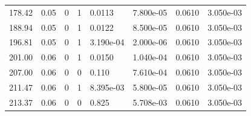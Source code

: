 \documentclass[preview]{standalone}
\begin{document}
{{\begin{tabular}{L{1.2cm}C{1.2cm} C{0.3cm}C{0.5cm} C{1.4cm}C{1.4cm} C{1.4cm}C{1.4cm}}
  178.42  &  0.05  & 0     &  1 &  0.0113  & 7.800e-05  & 0.0610 &  3.050e-03   \\ 
  188.94  &  0.05  & 0     &  1 &  0.0122  & 8.500e-05  & 0.0610 &  3.050e-03   \\ 
  196.81  &  0.05  & 0     &  1 &  3.190e-04  & 2.000e-06  & 0.0610 &  3.050e-03   \\ 
  201.00  &  0.06  & 0     &  1 &  0.0150  & 1.040e-04  & 0.0610 &  3.050e-03   \\ 
  207.00  &  0.06  & 0     &  0 &  0.110  & 7.610e-04  & 0.0610 &  3.050e-03   \\ 
  211.47  &  0.06  & 0     &  1 &  8.395e-03  & 5.800e-05  & 0.0610 &  3.050e-03   \\ 
  213.37  &  0.06  & 0     &  0 &  0.825  & 5.708e-03  & 0.0610 &  3.050e-03   \\ 
\hline 
\end{tabular} 

}}
\end{document}
